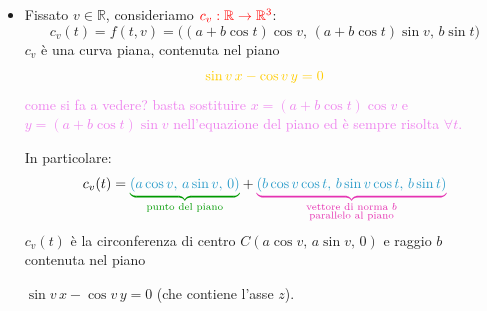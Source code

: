 \begin{esempio}
\begin{itemize}
            Il vettore tangente è:
            \[
            \dot{c}_u(t) = f_v(u,t) = (-\rho \sin t, \, \rho \cos t, \, 0)
            \]
            con \textcolor{blu}{$\norm{f_v} = a + b \cos u$} (dipende da $u$).
            
            La linea coordinata \textcolor{red}{$c_u$} è detta \textcolor{red}{parallelo} del toro.
            
            La curva $c_u$ è sezione normale di $f$? \textcolor{violet}{cosa sono le curve a sezione normale? sono le curve che si ottengono intersecando la superficie con un piani normali.}

            $c_u$ a sezione normale $\iff$ la normale di Gauss appartiene alla giacitura del piano della curva
            \[
            n(u,t) = (-\cos u \cos t, \, -\cos u \sin t, \, -\sin u)
            \]
            ovvero per $\sin u = 0 \iff u = k\pi$ \textcolor{violet}{(con $k \in \mathbb{Z}$)}.

            Pertanto, tra le linee coordinate $c_u$, solo i due equatori, quello esterno \textcolor{violet}{($u=0$)} e quello interno \textcolor{violet}{($u=\pi$)} corrispondenti a $u = 0$ e $u = \pi$, sono sezioni normali.

            \item Fissato $v \in \mathbb{R}$, consideriamo $\textcolor{red}{c_v : \mathbb{R} \to \mathbb{R}^3}$:
            \[ c_v(t) = f(t,v) = \big( (a + b \cos t)\cos v, \, (a + b \cos t)\sin v, \, b \sin t \big) \]
            $c_v$ è una curva piana, contenuta nel piano
            \[ \color{amber}
            \sin v \, x - \cos v \, y = 0
            \]
            \textcolor{violet}{come si fa a vedere? basta sostituire $x = (a + b \cos t)\cos v$ e $y = (a + b \cos t)\sin v$ nell'equazione del piano ed è sempre risolta $\forall t$.} 

            In particolare:
            \[
            c_v(t) = \textcolor{verde}{\underbrace{\textcolor{celeste}{(a \cos v, \, a \sin v, \, 0)}}_{\text{punto del piano}}} + \textcolor{hotpink}{\underbrace{\textcolor{celeste}{(b \cos v \cos t, \, b \sin v \cos t, \, b \sin t)}}_{\substack{\text{vettore di norma } b \\ \text{parallelo al piano}}}}
            \]
            $c_v(t)$ è la circonferenza di centro \textcolor{verde}{$C(a \cos v, \, a \sin v, \, 0)$} e raggio $b$ contenuta nel piano
            
            \textcolor{amber}{$\sin v \, x - \cos v \, y = 0$} (che contiene l'asse $z$). 
            

\end{itemize}
\end{esempio}
